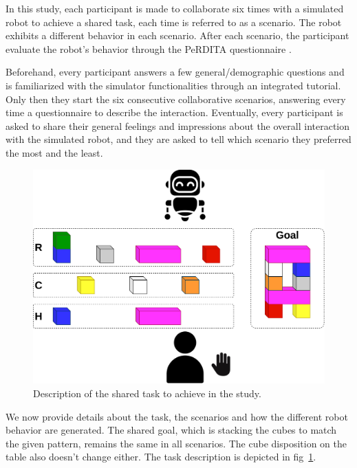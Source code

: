 In this study, each participant is made to collaborate six times with a simulated robot to achieve a shared task, each time is referred to as a scenario. The robot exhibits a different behavior in each scenario. After each scenario, the participant evaluate the robot's behavior through the PeRDITA questionnaire \cite{devin_evaluating_2018}.

Beforehand, every participant answers a few general/demographic questions and is familiarized with the simulator functionalities through an integrated tutorial. Only then they start the six consecutive collaborative scenarios, answering every time a questionnaire to describe the interaction. Eventually, every participant is asked to share their general feelings and impressions about the overall interaction with the simulated robot, and they are asked to tell which scenario they preferred the most and the least.

\begin{figure}
    \centering
    \includegraphics[width=0.8\linewidth]{images/Chapter5/task_description_study.png}
    \caption{Description of the shared task to achieve in the study.}
    \label{fig:task_description_study}
\end{figure}

We now provide details about the task, the scenarios and how the different robot behavior are generated. 
The shared goal, which is stacking the cubes to match the given pattern, remains the same in all scenarios. The cube disposition on the table also doesn't change either. The task description is depicted in fig~\ref{fig:task_description_study}. 

